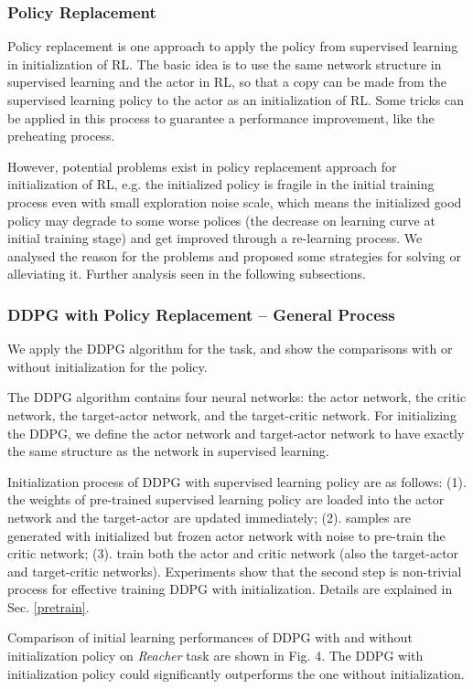 \documentclass{article}
\begin{document}
\subsubsection{Policy Replacement}
Policy replacement is one approach to apply the policy from supervised learning in initialization of RL. The basic idea is to use the same network structure in supervised learning and the actor in RL, so that a copy can be made from the supervised learning policy to the actor as an initialization of RL. Some tricks can be applied in this process to guarantee a performance improvement, like the preheating process. 

However, potential problems exist in policy replacement approach for initialization of RL, e.g. the initialized policy is fragile in the initial training process even with small exploration noise scale, which means the initialized good policy may degrade to some worse polices (the decrease on learning curve at initial training stage) and get improved through a re-learning process. We analysed the reason for the problems and proposed some strategies for solving or alleviating it. Further analysis seen in the following subsections.

\subsubsection{DDPG with Policy Replacement -- General Process}
We apply the DDPG algorithm for the task, and show the comparisons with or without initialization for the policy.

The DDPG algorithm contains four neural networks: the actor network, the critic network, the target-actor network, and the target-critic network. For initializing the DDPG, we define the actor network and target-actor network to have exactly the same structure as the network in supervised learning. 

Initialization process of DDPG with supervised learning policy are as follows: 
(1). the weights of pre-trained supervised learning policy are loaded into the actor network and the target-actor are updated immediately; (2). samples are generated with initialized but frozen actor network with noise to pre-train the critic network; (3). train both the actor and critic network (also the target-actor and target-critic networks). Experiments show that the second step is non-trivial process for effective training DDPG with initialization. Details are explained in Sec. \ref{pretrain}.

Comparison of initial learning performances of DDPG with and without initialization policy on \textit{Reacher} task are shown in Fig. 4. The DDPG with initialization policy could significantly outperforms the one without initialization. 
\end{document}
